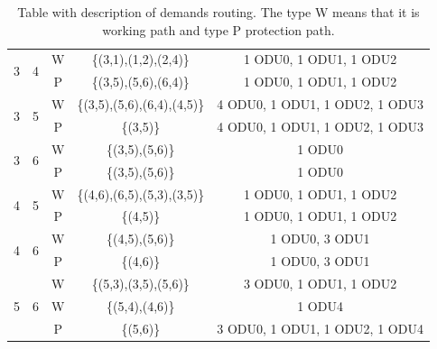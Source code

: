 \begin{table}[h!]
\begin{tabular}{||c|c|c|c|c||}
 \multirow{2}{*}{3} & \multirow{2}{*}{4}&W& \{(3,1),(1,2),(2,4)\} & 1 ODU0, 1 ODU1, 1 ODU2 \\
  & &P& \{(3,5),(5,6),(6,4)\} & 1 ODU0, 1 ODU1, 1 ODU2 \\ \hline
 \multirow{2}{*}{3}&\multirow{2}{*}{5}&W&\{(3,5),(5,6),(6,4),(4,5)\}&4 ODU0, 1 ODU1, 1 ODU2, 1 ODU3\\
  & &P& \{(3,5)\} & 4 ODU0, 1 ODU1, 1 ODU2, 1 ODU3 \\ \hline
 \multirow{2}{*}{3} & \multirow{2}{*}{6}&W& \{(3,5),(5,6)\} & 1 ODU0 \\
  & &P& \{(3,5),(5,6)\} & 1 ODU0 \\ \hline
 \multirow{2}{*}{4} & \multirow{2}{*}{5}&W& \{(4,6),(6,5),(5,3),(3,5)\} & 1 ODU0, 1 ODU1, 1 ODU2 \\
  & &P& \{(4,5)\} & 1 ODU0, 1 ODU1, 1 ODU2 \\ \hline
 \multirow{2}{*}{4} & \multirow{2}{*}{6}&W& \{(4,5),(5,6)\} & 1 ODU0, 3 ODU1\\
  & &P& \{(4,6)\} & 1 ODU0, 3 ODU1\\ \hline
 \multirow{3}{*}{5} & \multirow{3}{*}{6}&W&\{(5,3),(3,5),(5,6)\}& 3 ODU0, 1 ODU1, 1 ODU2 \\
  & &W& \{(5,4),(4,6)\} & 1 ODU4 \\
  & &P& \{(5,6)\}& 3 ODU0, 1 ODU1, 1 ODU2, 1 ODU4 \\ \hline
\end{tabular}
\caption{Table with description of demands routing. The type W means that it is working path and type P protection path.}
\label{path_transluc_protec_ref_low}
\end{table}

